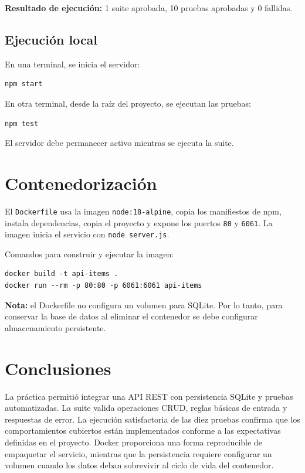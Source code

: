 \documentclass[12pt,a4paper]{article}
\begin{document}
\textbf{Resultado de ejecución:} 1 suite aprobada, 10 pruebas aprobadas y 0 fallidas.

\subsection{Ejecución local}
En una terminal, se inicia el servidor:
\begin{lstlisting}[style=codigo]
npm start
\end{lstlisting}

En otra terminal, desde la raíz del proyecto, se ejecutan las pruebas:
\begin{lstlisting}[style=codigo]
npm test
\end{lstlisting}

El servidor debe permanecer activo mientras se ejecuta la suite.

\section{Contenedorización}
El \texttt{Dockerfile} usa la imagen \texttt{node:18-alpine}, copia los manifiestos de npm, instala dependencias, copia el proyecto y expone los puertos \texttt{80} y \texttt{6061}. La imagen inicia el servicio con \texttt{node server.js}.

Comandos para construir y ejecutar la imagen:
\begin{lstlisting}[style=codigo]
docker build -t api-items .
docker run --rm -p 80:80 -p 6061:6061 api-items
\end{lstlisting}

\textbf{Nota:} el Dockerfile no configura un volumen para SQLite. Por lo tanto, para conservar la base de datos al eliminar el contenedor se debe configurar almacenamiento persistente.

\section{Conclusiones}
La práctica permitió integrar una API REST con persistencia SQLite y pruebas automatizadas. La suite valida operaciones CRUD, reglas básicas de entrada y respuestas de error. La ejecución satisfactoria de las diez pruebas confirma que los comportamientos cubiertos están implementados conforme a las expectativas definidas en el proyecto. Docker proporciona una forma reproducible de empaquetar el servicio, mientras que la persistencia requiere configurar un volumen cuando los datos deban sobrevivir al ciclo de vida del contenedor.
\end{document}
